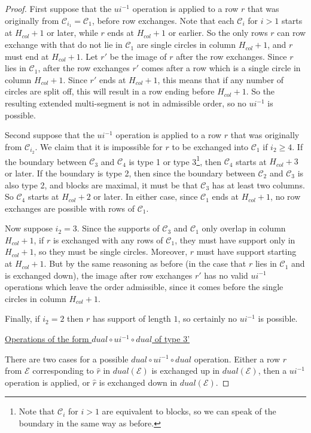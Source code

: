 \documentclass[11pt,letterpaper]{amsart}
\newcommand{\inv}{^{-1}}
\newcommand{\CC}{\mathcal{C}}
\newcommand{\EE}{\mathcal{E}}
\numberwithin{equation}{section}
\begin{document}
\begin{proof}
    First suppose that the $ui\inv$ operation is applied to a row $r$ that was originally from $\CC_{i_1} = \CC_1$, before row exchanges. Note that each $\CC_i$ for $i>1$ starts at $H_{col}+1$ or later, while $r$ ends at $H_{col}+1$ or earlier. So the only rows $r$ can row exchange with that do not lie in $\CC_1$ are single circles in column $H_{col}+1$, and $r$ must end at $H_{col}+1$. Let $r'$ be the image of $r$ after the row exchanges. Since $r$ lies in $\CC_1$, after the row exchanges $r'$ comes after a row which is a single circle in column $H_{col}+1$. Since $r'$ ends at $H_{col}+1$, this means that if any number of circles are split off, this will result in a row ending before $H_{col}+1$. So the resulting extended multi-segment is not in admissible order, so no $ui\inv$ is possible.

    Second suppose that the $ui\inv$ operation is applied to a row $r$ that was originally from $\CC_{i_2}$. We claim that it is impossible for $r$ to be exchanged into $\CC_1$ if $i_2 \geq 4$. If the boundary between $\CC_3$ and $\CC_4$ is type 1 or type 3\footnote{Note that $\CC_i$ for $i>1$ are equivalent to blocks, so we can speak of the boundary in the same way as before.}, then $\CC_4$ starts at $H_{col}+3$ or later. If the boundary is type 2, then since the boundary between $\CC_2$ and $\CC_3$ is also type 2, and blocks are maximal, it must be that $\CC_3$ has at least two columns. So $\CC_4$ starts at $H_{col}+2$ or later. In either case, since $\CC_1$ ends at $H_{col}+1$, no row exchanges are possible with rows of $\CC_1$.

    Now suppose $i_2 = 3$. Since the supports of $\CC_3$ and $\CC_1$ only overlap in column $H_{col}+1$, if $r$ is exchanged with any rows of $\CC_1$, they must have support only in $H_{col}+1$, so they must be single circles. Moreover, $r$ must have support starting at $H_{col}+1$. But by the same reasoning as before (in the case that $r$ lies in $\CC_1$ and is exchanged down), the image after row exchanges $r'$ has no valid $ui\inv$ operations which leave the order admissible, since it comes before the single circles in column $H_{col}+1$.

    Finally, if $i_2 = 2$ then $r$ has support of length $1$, so certainly no $ui\inv$ is possible. 
    
    \underline{Operations of the form $dual \circ ui\inv \circ dual$ of type 3'}

    There are two cases for a possible $dual \circ ui\inv \circ dual$ operation. Either a row $r$ from $\EE$ corresponding to $\widehat{r}$ in $dual(\EE)$ is exchanged up in $dual(\EE)$, then a $ui\inv$ operation is applied, or $\widehat{r}$ is exchanged down in $dual(\EE)$.


\end{proof}
\end{document}
